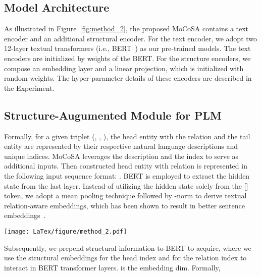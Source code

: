 \documentclass[11pt]{article}
\begin{document}
\subsection{Model Architecture}

As illustrated in Figure~\ref{fig:method_2}, the proposed MoCoSA contains a text encoder and an additional structural encoder. For the text encoder, we adopt two 12-layer textual transformers (i.e., BERT~\cite{devlin-etal-2019-bert}) as our pre-trained models. 
The text encoders are initialized by weights of the BERT. For the structure encoders, we compose an embedding layer and a linear projection, which is initialized with random weights. The hyper-parameter details of these encoders are described in the Experiment.

\subsection{Structure-Augumented Module for PLM}

Formally, for a given triplet (, , ), the head entity with the relation and the tail entity are represented by their respective natural language descriptions and unique indices. MoCoSA leverages the description  and the index  to serve as additional inputs. Then constructed head entity with relation is represented in the following input sequence format: . BERT is employed to extract the hidden state  from the last layer. Instead of utilizing the hidden state solely from the [] token, we adopt a mean pooling technique followed by -norm to derive textual relation-aware embeddings, which has been shown to result in better sentence embeddings~\cite{gao2021simcse,Reimers2019SentenceBERTSE}. 
\begin{figure*}[!htb]
  \centering
\texttt{[image: LaTex/figure/method\_2.pdf]}
\caption{An overview of the framework of MoCoSA, with the model architecture of structure-augmented PLM shown on the right. ASE is the adaptable structural encoder. The structural features interact with the textual query in the self-attention mechanism of PLM. To improve the performance of MoCoSA, we use three contrastive losses named in-batch 
 contrast, momentum contrast, and instra-relation contrast are shown on the left.}
  \label{fig:method_2}
\vspace{-5pt}
\end{figure*}
Subsequently, we prepend structural information to BERT to acquire, where we use the structural embeddings  for the head index  and  for the relation index  to interact in BERT transformer layers.  is the embedding dim. Formally,
\end{document}
